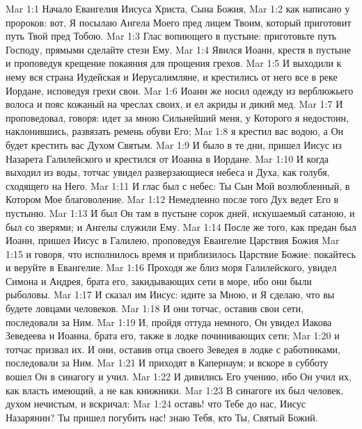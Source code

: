 \vs Mar 1:1 Начало Евангелия Иисуса Христа, Сына Божия,
\vs Mar 1:2 как написано у пророков: вот, Я посылаю Ангела Моего пред лицем Твоим, который приготовит путь Твой пред Тобою.
\vs Mar 1:3 Глас вопиющего в пустыне: приготовьте путь Господу, прямыми сделайте стези Ему.
\rsbpar\vs Mar 1:4 Явился Иоанн, крестя в пустыне и проповедуя крещение покаяния для прощения грехов.
\vs Mar 1:5 И выходили к нему вся страна Иудейская и Иерусалимляне, и крестились от него все в реке Иордане, исповедуя грехи свои.
\vs Mar 1:6 Иоанн же носил одежду из верблюжьего волоса и пояс кожаный на чреслах своих, и ел акриды и дикий мед.
\vs Mar 1:7 И проповедовал, говоря: идет за мною Сильнейший меня, у Которого я недостоин, наклонившись, развязать ремень обуви Его;
\vs Mar 1:8 я крестил вас водою, а Он будет крестить вас Духом Святым.
\rsbpar\vs Mar 1:9 И было в те дни, пришел Иисус из Назарета Галилейского и крестился от Иоанна в Иордане.
\vs Mar 1:10 И когда выходил из воды, тотчас увидел  разверзающиеся небеса и Духа, как голубя, сходящего на Него.
\vs Mar 1:11 И глас был с небес: Ты Сын Мой возлюбленный, в Котором Мое благоволение.
\rsbpar\vs Mar 1:12 Немедленно после того Дух ведет Его в пустыню.
\vs Mar 1:13 И был Он там в пустыне сорок дней, искушаемый сатаною, и был со зверями; и Ангелы служили Ему.
\rsbpar\vs Mar 1:14 После же того, как предан был Иоанн, пришел Иисус в Галилею, проповедуя Евангелие Царствия Божия
\vs Mar 1:15 и говоря, что исполнилось время и приблизилось Царствие Божие: покайтесь и веруйте в Евангелие.
\rsbpar\vs Mar 1:16 Проходя же близ моря Галилейского, увидел Симона и Андрея, брата его, закидывающих сети в море, ибо они были рыболовы.
\vs Mar 1:17 И сказал им Иисус: идите за Мною, и Я сделаю, что вы будете ловцами человеков.
\vs Mar 1:18 И они тотчас, оставив свои сети, последовали за Ним.
\vs Mar 1:19 И, пройдя оттуда немного, Он увидел Иакова Зеведеева и Иоанна, брата его, также в лодке починивающих сети;
\vs Mar 1:20 и тотчас призвал их. И они, оставив отца своего Зеведея в лодке с работниками, последовали за Ним.
\rsbpar\vs Mar 1:21 И приходят в Капернаум; и вскоре в субботу вошел Он в синагогу и учил.
\vs Mar 1:22 И дивились Его учению, ибо Он учил их, как власть имеющий, а не как книжники.
\vs Mar 1:23 В синагоге их был человек,  духом нечистым, и вскричал:
\vs Mar 1:24 оставь! что Тебе до нас, Иисус Назарянин? Ты пришел погубить нас! знаю Тебя, кто Ты, Святый Божий.
